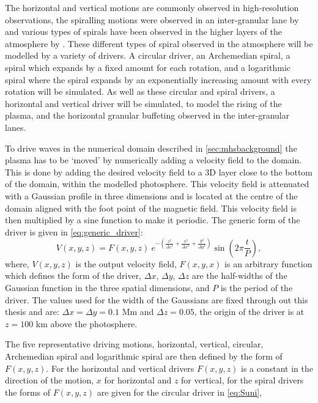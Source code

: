 The horizontal and vertical motions are commonly observed in high-resolution observations, the spiralling motions were observed in an inter-granular lane by \cite{bonet2008, bonet2010} and various types of spirals have been observed in the higher layers of the atmosphere by \cite{wedemeyer-bohm2009,wedemeyer-bohm2012,wedemeyer2013}.
These different types of spiral observed in the atmosphere will be modelled by a variety of drivers.
A circular driver, an Archemedian spiral, a spiral which expands by a fixed amount for each rotation, and a logarithmic spiral where the spiral expands by an exponentially increasing amount with every rotation will be simulated.
As well as these circular and spiral drivers, a horizontal and vertical driver will be simulated, to model the rising of the plasma, and the horizontal granular buffeting observed in the inter-granular lanes.

To drive waves in the numerical domain described in \cref{sec:mhsbackground} the plasma has to be `moved' by numerically adding a velocity field to the domain.
This is done by adding the desired velocity field to a 3D layer close to the bottom of the domain, within the modelled photosphere.
This velocity field is attenuated with a Gaussian profile in three dimensions and is located at the centre of the domain aligned with the foot point of the magnetic field.
This velocity field is then multiplied by a sine function to make it periodic. The generic form of the driver is given in \cref{eq:generic_driver}:
\begin{equation}
	V(x,y,z) = F(x,y,z) \ e^{-\left(\frac{z^2}{\Delta z^2} + \frac{x^2}{\Delta x^2} + \frac{y^2}{\Delta y^2}\right)} \sin \left(2\pi \frac{t}{P}\right),
	\label{eq:generic_driver}
\end{equation}
where, $V(x,y,z)$ is the output velocity field, $F(x,y,x)$ is an arbitrary function which defines the form of the driver, $\Delta x$, $\Delta y$, $\Delta z$ are the half-widths of the Gaussian function in the three spatial dimensions, and $P$ is the period of the driver.
The values used for the width of the Gaussians are fixed through out this thesis and are: $\Delta x = \Delta y = 0.1$ Mm and $\Delta z = 0.05$, the origin of the driver is at $z = 100$ km above the photosphere.

The five representative driving motions, horizontal, vertical, circular, Archemedian spiral and logarithmic spiral are then defined by the form of $F(x,y,z)$. For the horizontal and vertical drivers $F(x,y,z)$ is a constant in the direction of the motion, $x$ for horizontal and $z$ for vertical, for the spiral drivers the forms of $F(x,y,z)$ are given for the circular driver in \cref{eq:Suni},

